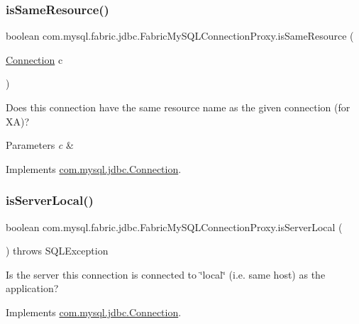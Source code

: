 \subsubsection{\texorpdfstring{is\+Same\+Resource()}{isSameResource()}}
{\footnotesize\ttfamily boolean com.\+mysql.\+fabric.\+jdbc.\+Fabric\+My\+S\+Q\+L\+Connection\+Proxy.\+is\+Same\+Resource (\begin{DoxyParamCaption}\item[{\mbox{\hyperlink{interfacecom_1_1mysql_1_1jdbc_1_1_connection}{Connection}}}]{c }\end{DoxyParamCaption})}

Does this connection have the same resource name as the given connection (for XA)?


\begin{DoxyParams}{Parameters}
{\em c} & \\
\hline
\end{DoxyParams}


Implements \mbox{\hyperlink{interfacecom_1_1mysql_1_1jdbc_1_1_connection_a3663c7e933a14a8cc26e16d0f78956a6}{com.\+mysql.\+jdbc.\+Connection}}.

\mbox{\label{classcom_1_1mysql_1_1fabric_1_1jdbc_1_1_fabric_my_s_q_l_connection_proxy_a8ed4333a3f7243ba6460b94c5fa204d4}} 
\subsubsection{\texorpdfstring{is\+Server\+Local()}{isServerLocal()}}
{\footnotesize\ttfamily boolean com.\+mysql.\+fabric.\+jdbc.\+Fabric\+My\+S\+Q\+L\+Connection\+Proxy.\+is\+Server\+Local (\begin{DoxyParamCaption}{ }\end{DoxyParamCaption}) throws S\+Q\+L\+Exception}

Is the server this connection is connected to \char`\"{}local\char`\"{} (i.\+e. same host) as the application? 

Implements \mbox{\hyperlink{interfacecom_1_1mysql_1_1jdbc_1_1_connection_a37eb25137505b9aaf4b25a847f87e949}{com.\+mysql.\+jdbc.\+Connection}}.

